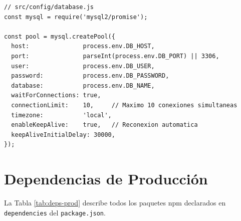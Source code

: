 \begin{lstlisting}[style=javascript, caption={Configuración del pool de conexiones MySQL}, label={lst:db-pool}]
// src/config/database.js
const mysql = require('mysql2/promise');

const pool = mysql.createPool({
  host:               process.env.DB_HOST,
  port:               parseInt(process.env.DB_PORT) || 3306,
  user:               process.env.DB_USER,
  password:           process.env.DB_PASSWORD,
  database:           process.env.DB_NAME,
  waitForConnections: true,
  connectionLimit:    10,     // Maximo 10 conexiones simultaneas
  timezone:           'local',
  enableKeepAlive:    true,   // Reconexion automatica
  keepAliveInitialDelay: 30000,
});
\end{lstlisting}

\section{Dependencias de Producción}

La Tabla \ref{tab:deps-prod} describe todos los paquetes npm declarados en \texttt{dependencies} del \texttt{package.json}.

